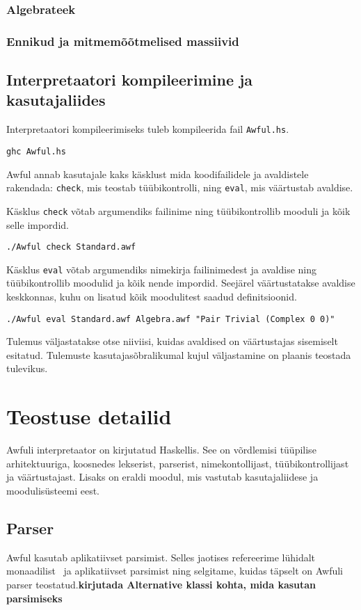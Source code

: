 \documentclass[12pt]{article}
\newcommand\peatykk[1]{
  \clearpage
  \section{#1}}
\newcommand\markus[1]{\textcolor{roheline}{\textbf{#1}}}
\begin{document}
      \subsubsection{Algebrateek}
        
      \subsubsection{Ennikud ja mitmemõõtmelised massiivid}
        
    \subsection{Interpretaatori kompileerimine ja kasutajaliides}
      Interpretaatori kompileerimiseks tuleb kompileerida fail \verb!Awful.hs!.

      \begin{verbatim}ghc Awful.hs\end{verbatim}

      Awful annab kasutajale kaks käsklust mida koodifailidele ja avaldistele rakendada: \verb!check!, mis teostab tüübikontrolli, ning \verb!eval!, mis väärtustab avaldise.

      Käsklus \verb!check! võtab argumendiks failinime ning tüübikontrollib mooduli ja kõik selle impordid.

      \begin{verbatim}./Awful check Standard.awf\end{verbatim}

      Käsklus \verb!eval! võtab argumendiks nimekirja failinimedest ja avaldise ning tüübikontrollib moodulid ja kõik nende impordid. Seejärel väärtustatakse avaldise keskkonnas, kuhu on lisatud kõik moodulitest saadud definitsioonid.

      \begin{verbatim}./Awful eval Standard.awf Algebra.awf "Pair Trivial (Complex 0 0)"\end{verbatim}

      Tulemus väljastatakse otse niiviisi, kuidas avaldised on väärtustajas sisemiselt esitatud. Tulemuste kasutajasõbralikumal kujul väljastamine on plaanis teostada tulevikus.
  \peatykk{Teostuse detailid}
    Awfuli interpretaator on kirjutatud Haskellis. See on võrdlemisi tüüpilise arhitektuuriga, koosnedes lekserist, parserist, nimekontollijast, tüübikontrollijast ja väärtustajast. Lisaks on eraldi moodul, mis vastutab kasutajaliidese ja moodulisüsteemi eest.
    \subsection{Parser}
      Awful kasutab aplikatiivset parsimist. Selles jaotises refereerime lühidalt monaadilist~\cite{Mon} ja aplikatiivset parsimist ning selgitame, kuidas täpselt on Awfuli parser teostatud.\markus{kirjutada Alternative klassi kohta, mida kasutan parsimiseks}
\end{document}
